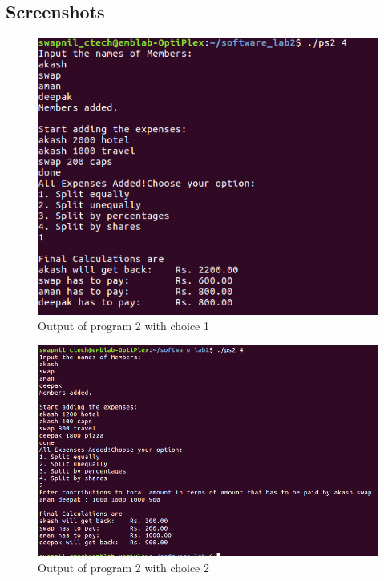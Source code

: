 \documentclass[12pt,a4paper]{article}
\begin{document}
        \subsection{Screenshots}
            \begin{figure}[H]
                \centering
                \includegraphics[width=\linewidth]{ps2_1.png}
                \caption{Output of program 2 with choice 1}
                \label{fig:my_label1}
            \end{figure}
            \begin{figure}[H]
                \centering
                \includegraphics[width=\linewidth]{ps2_2.png}
                \caption{Output of program 2 with choice 2}
                \label{fig:my_label2}
            \end{figure}
\end{document}
